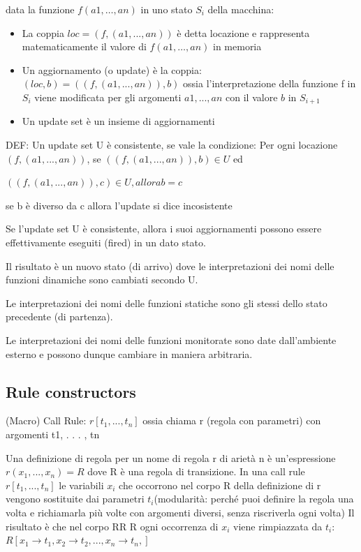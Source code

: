 \documentclass{article}
\begin{document}
data la funzione $f(a1, …, an)$ in uno stato $S_i$ della macchina:
\begin{itemize}
  \item La coppia $loc=(f , (a1, . . . , an))$ è detta locazione e 
rappresenta matematicamente il valore di $f(a1, …, an)$ in 
memoria 
\item Un aggiornamento (o update) è la coppia:  $(loc,b) = ((f , (a1, . . . , an)), b)$ ossia l’interpretazione della funzione f in $S_i$ viene modificata per gli argomenti $a1, . . . , an$ con il valore $b$ in $S_{i+1}$
\item  Un update set è un insieme di aggiornamenti
\end{itemize}

DEF: Un update set U è consistente, se vale la condizione:
Per ogni locazione $(f , (a1, . . . , an))$,
se $((f , (a1, . . . , an)), b) \in U $  ed

$((f , (a1, . . . , an)), c)  \in U, allora b = c$

se b è diverso da c allora l'update si dice incosistente 

Se l’update set U è consistente, allora i suoi aggiornamenti 
possono essere effettivamente eseguiti (fired) in un dato stato.

Il risultato è un nuovo stato (di arrivo) dove le interpretazioni dei nomi delle funzioni dinamiche sono cambiati secondo U.

Le interpretazioni dei nomi delle funzioni statiche sono gli stessi
dello stato precedente (di partenza).

Le interpretazioni dei nomi delle funzioni monitorate sono date 
dall’ambiente esterno e possono dunque cambiare in maniera 
arbitraria.

\subsection*{Rule constructors}
(Macro) Call Rule: $r [t_1, . . . , t_n]$ ossia chiama r (regola con parametri) con argomenti t1, 
. . . , tn

Una definizione di regola per un nome di regola r di arietà n è 
un’espressione $r(x_1, ..., x_n) = R$ dove R è una regola di transizione.
In una call rule $r [t_1, . . . , t_n]$ le variabili $x_i$ che occorrono nel corpo R della definizione di r vengono sostituite dai parametri $t_i$(modularità: perché puoi definire la regola una volta e richiamarla più volte con argomenti diversi, senza riscriverla ogni volta)
Il risultato è che nel corpo RR
R ogni occorrenza di $x_i$ viene rimpiazzata da $t_i$: $R[x_1 \rightarrow t_1, x_2 \rightarrow t_2, ..., x_n \rightarrow t_n,]$
\end{document}
